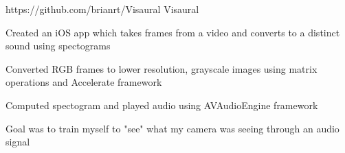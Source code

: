 \begin{cventries}
  \cventry
    {https://github.com/brianrt/Visaural} %
    {Visaural} %
    {} %
    {} %
    {
      \begin{cvitems} %
        \item {Created an iOS app which takes frames from a video and converts to a distinct sound using spectograms}
        \item {Converted RGB frames to lower resolution, grayscale images using matrix operations and Accelerate framework}
        \item {Computed spectogram and played audio using AVAudioEngine framework}
        \item {Goal was to train myself to "see" what my camera was seeing through an audio signal}
      \end{cvitems}
    }

\end{cventries}
